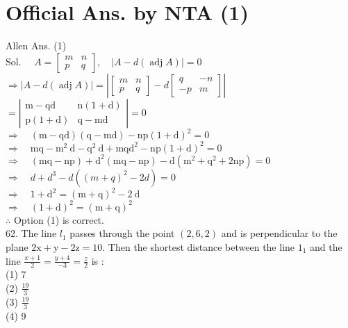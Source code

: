 \documentclass[10pt]{article}
\begin{document}
\section*{Official Ans. by NTA (1)}
Allen Ans. (1)\\
Sol. \(\quad A=\left[\begin{array}{cc}m & n \\ p & q\end{array}\right], \quad|A-d(\operatorname{adj} A)|=0\)\\
\(\Rightarrow|A-d(\operatorname{adj} A)|=\left|\left[\begin{array}{cc}m & n \\ p & q\end{array}\right]-d\left[\begin{array}{cc}q & -n \\ -p & m\end{array}\right]\right|\)\\
\(=\left|\begin{array}{cc}\mathrm{m}-\mathrm{qd} & \mathrm{n}(1+\mathrm{d}) \\ \mathrm{p}(1+\mathrm{d}) & \mathrm{q}-\mathrm{md}\end{array}\right|=0\)\\
\(\Rightarrow \quad(\mathrm{m}-\mathrm{qd})(\mathrm{q}-\mathrm{md})-\mathrm{np}(1+\mathrm{d})^{2}=0\)\\
\(\Rightarrow \quad \mathrm{mq}-\mathrm{m}^{2} \mathrm{~d}-\mathrm{q}^{2} \mathrm{~d}+\mathrm{mqd}^{2}-\mathrm{np}(1+\mathrm{d})^{2}=0\)\\
\(\Rightarrow \quad(\mathrm{mq}-\mathrm{np})+\mathrm{d}^{2}(\mathrm{mq}-\mathrm{np})-\mathrm{d}\left(\mathrm{m}^{2}+\mathrm{q}^{2}+2 \mathrm{np}\right)=0\)\\
\(\Rightarrow \quad d+d^{3}-d\left((m+q)^{2}-2 d\right)=0\)\\
\(\Rightarrow \quad 1+\mathrm{d}^{2}=(\mathrm{m}+\mathrm{q})^{2}-2 \mathrm{~d}\)\\
\(\Rightarrow \quad(1+\mathrm{d})^{2}=(\mathrm{m}+\mathrm{q})^{2}\)\\
\(\therefore\) Option (1) is correct.\\
62. The line \(l_{1}\) passes through the point \((2,6,2)\) and is perpendicular to the plane \(2 \mathrm{x}+\mathrm{y}-2 \mathrm{z}=10\). Then the shortest distance between the line \(1_{1}\) and the line \(\frac{x+1}{2}=\frac{y+4}{-3}=\frac{z}{2}\) is :\\
(1) 7\\
(2) \(\frac{19}{3}\)\\
(3) \(\frac{19}{3}\)\\
(4) 9
\end{document}
